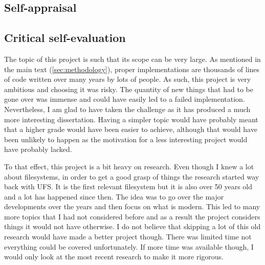 \begin{appendices}

\chapter{Self-appraisal}

    \section{Critical self-evaluation}

        The topic of this project is such that its scope can be very large. As
        mentioned in the main text (\autoref{sec:methodology}), proper
        implementations are thousands of lines of code written over many years
        by lots of people. As such, this project is very ambitious and choosing
        it was risky. The quantity of new things that had to be gone over was
        immense and could have easily led to a failed implementation.
        Nevertheless, I am glad to have taken the challenge as it has produced
        a much more interesting dissertation. Having a simpler topic would have
        probably meant that a higher grade would have been easier to achieve,
        although that would have been unlikely to happen as the motivation for
        a less interesting project would have probably lacked.

        To that effect, this project is a bit heavy on research. Even though I
        knew a lot about filesystems, in order to get a good grasp of things
        the research started way back with UFS. It is the first relevant
        filesystem but it is also over 50 years old and a lot has happened
        since then. The idea was to go over the major developments over the
        years and then focus on what is modern. This led to many more topics
        that I had not considered before and as a result the project considers
        things it would not have otherwise. I do not believe that skipping a
        lot of this old research would have made a better project though. There
        was limited time not everything could be covered unfortunately. If more
        time was available though, I would only look at the most recent
        research to make it more rigorous.



\end{appendices}
